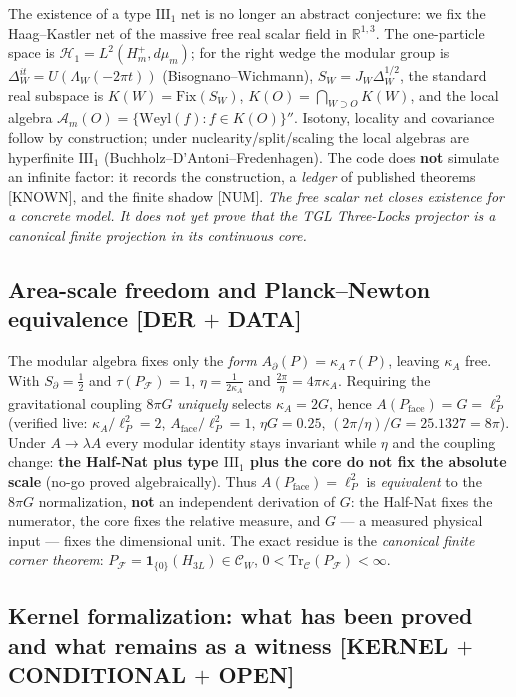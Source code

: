 \documentclass[11pt]{article}
\theoremstyle{definition}\newtheorem{deriv}{Derivation}
\begin{document}
The existence of a type $\mathrm{III}_1$ net is no longer an abstract conjecture: we fix the Haag--Kastler net of the massive free real scalar field in $\mathbb R^{1,3}$. The one-particle space is $\mathcal H_1=L^2(H_m^+,d\mu_m)$; for the right wedge the modular group is $\Delta_W^{it}=U(\Lambda_W(-2\pi t))$ (Bisognano--Wichmann), $S_W=J_W\Delta_W^{1/2}$, the standard real subspace is $K(W)=\mathrm{Fix}(S_W)$, $K(O)=\bigcap_{W\supset O}K(W)$, and the local algebra $\mathcal A_m(O)=\{\mathrm{Weyl}(f):f\in K(O)\}''$. Isotony, locality and covariance follow by construction; under nuclearity/split/scaling the local algebras are hyperfinite $\mathrm{III}_1$ (Buchholz--D'Antoni--Fredenhagen). The code does \textbf{not} simulate an infinite factor: it records the construction, a \emph{ledger} of published theorems \textsf{[KNOWN]}, and the finite shadow \textsf{[NUM]}. \emph{The free scalar net closes existence for a concrete model. It does not yet prove that the TGL Three-Locks projector is a canonical finite projection in its continuous core.}

\subsection*{Area-scale freedom and Planck--Newton equivalence \textsf{[DER $+$ DATA]}}

The modular algebra fixes only the \emph{form} $A_\partial(P)=\kappa_A\,\tau(P)$, leaving $\kappa_A$ free. With $S_\partial=\tfrac12$ and $\tau(P_{\mathcal F})=1$, $\eta=\tfrac{1}{2\kappa_A}$ and $\tfrac{2\pi}{\eta}=4\pi\kappa_A$. Requiring the gravitational coupling $8\pi G$ \emph{uniquely} selects $\kappa_A=2G$, hence $A(P_{\mathrm{face}})=G=\ell_P^2$ (verified live: $\kappa_A/\ell_P^2=2$, $A_{\mathrm{face}}/\ell_P^2=1$, $\eta G=0.25$, $(2\pi/\eta)/G=25.1327=8\pi$). Under $A\to\lambda A$ every modular identity stays invariant while $\eta$ and the coupling change: \textbf{the Half-Nat plus type $\mathrm{III}_1$ plus the core do not fix the absolute scale} (no-go proved algebraically). Thus $A(P_{\mathrm{face}})=\ell_P^2$ is \emph{equivalent} to the $8\pi G$ normalization, \textbf{not} an independent derivation of $G$: the Half-Nat fixes the numerator, the core fixes the relative measure, and $G$ --- a measured physical input --- fixes the dimensional unit. The exact residue is the \emph{canonical finite corner theorem}: $P_{\mathcal F}=\mathbf 1_{\{0\}}(H_{3L})\in\mathcal C_W$, $0<\mathrm{Tr}_{\mathcal C}(P_{\mathcal F})<\infty$.

\subsection*{Kernel formalization: what has been proved and what remains as a witness \textsf{[KERNEL $+$ CONDITIONAL $+$ OPEN]}}
\end{document}
